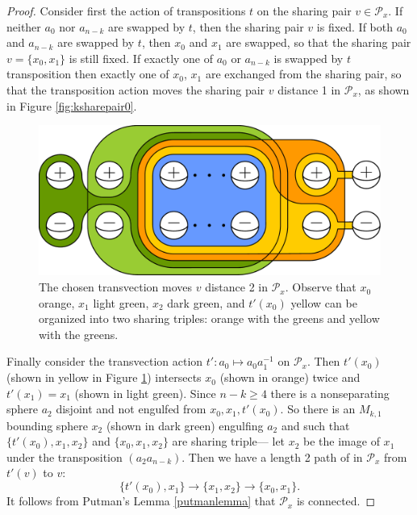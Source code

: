 \documentclass[11pt]{article}
\theoremstyle{remark}
\theoremstyle{definition}
\begin{document}
\begin{proof}
  Consider first the action of   transpositions $t$ on
  the sharing pair $v \in \mathcal P_x$.
  If neither $a_0$ nor $a_{n-k}$ are swapped by $t$,
  then the sharing pair $v$ is fixed.
  If both $a_0$ and $a_{n-k}$ are swapped by $t$,
  then $x_0$ and $x_1$ are swapped, so that the sharing pair $v=\{x_0,x_1\}$
  is still fixed.
  If exactly one of $a_0$ or $a_{n-k}$ is swapped by $t$
  transposition then exactly one of $x_0$, $x_1$ are exchanged from the sharing pair,
  so that the transposition action moves the sharing pair $v$ distance 1 in $\mathcal P_x$,
  as shown in Figure \ref{fig:ksharepair0}.


  \begin{figure}[t!]
    \centering
          \includegraphics[width=.8\textwidth]{figures/ksharepairgraph1.pdf}
          \caption{The chosen transvection moves $v$
          distance 2 in $\mathcal P_x$.
          Observe that $x_0$ orange, $x_1$ light green,
          $x_2$ dark green, and $t'(x_0)$ yellow can be organized
          into two sharing triples: orange with the greens and yellow with the greens.}
          \label{fig:ksharepair1}
  \end{figure}

  Finally consider the transvection action $t':a_0 \mapsto a_0a_1^{-1}$ on $\mathcal P_x$.
Then $t'(x_0)$ (shown in yellow in Figure \ref{fig:ksharepair1})
intersects $x_0$ (shown in orange) twice and $t'(x_1)=x_1$ (shown in light green).
Since $n-k\geq 4$ there is a nonseparating sphere $a_2$
disjoint and not engulfed from $x_0, x_1, t'(x_0)$.
So there is an $M_{k,1}$ bounding sphere $x_2$ (shown in dark green)
engulfing $a_2$ and such that $\{t'(x_0),x_1,x_2\}$ and $\{x_0,x_1,x_2\}$ are sharing triple---
let $x_2$ be the image of $x_1$ under the transposition $(a_2a_{n-k})$.
Then we have a length 2 path of in $\mathcal P_x$
from $t'(v)$ to $v$:
$$\{t'(x_0),x_1 \} \to \{x_1,x_2\} \to \{x_0,x_1\}.$$
It follows from Putman's Lemma \ref{putmanlemma} that $\mathcal P_x$
is connected.
\end{proof}
\end{document}
